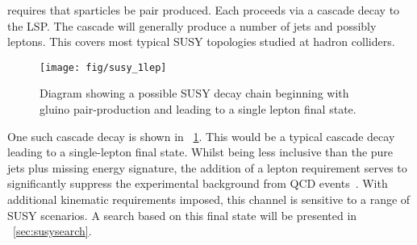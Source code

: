 \Rparity requires that sparticles be pair produced. Each proceeds via a cascade
decay to the \ac{LSP}. The cascade will generally produce a number of jets and
possibly leptons. This covers most typical \ac{SUSY} topologies studied at
hadron colliders.

\begin{figure}[h!]
\centering
\texttt{[image: fig/susy\_1lep]}
\caption[\acs{SUSY} decay chain leading to a single lepton final state]{Diagram
  showing a possible \ac{SUSY} decay chain beginning with gluino pair-production
  and leading to a single lepton final state.}
\label{fig:susy_1lep_decay}
\end{figure}

One such cascade decay is shown in \fig~\ref{fig:susy_1lep_decay}. This would be
a typical cascade decay leading to a single-lepton final state. Whilst being
less inclusive than the pure jets plus missing energy signature, the addition of
a lepton requirement serves to significantly suppress the experimental
background from \ac{QCD} events~\cite{msugra_signals}. With additional kinematic
requirements imposed, this channel is sensitive to a range of \ac{SUSY}
scenarios. A search based on this final state will be presented in
\chap~\ref{sec:susysearch}.
